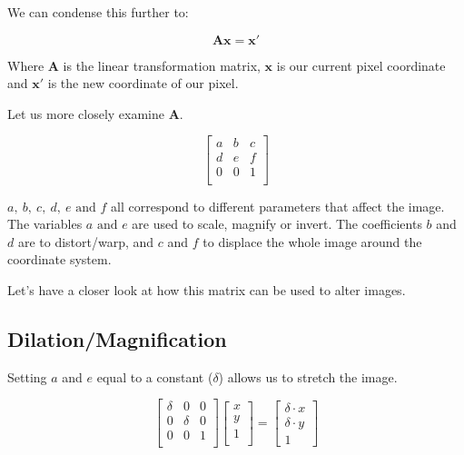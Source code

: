 \documentclass{article}
\begin{document}
We can condense this further to: 

\[%
    \mathbf{A} \mathbf{x} = \mathbf{x}'
\]%

Where $ \mathbf{A} $ is the linear transformation matrix, $ \mathbf{x} $ is our
current pixel coordinate and $ \mathbf{x}' $ is the new coordinate of our pixel.



Let us more closely examine $ \mathbf{A} $.

\[%
    \begin{bmatrix}
        a & b & c \\
		d & e & f \\
		0 & 0 & 1 \\	
    \end{bmatrix}
\]%

$ a,\ b, \ c, \ d, \ e \text{ and }f$ all correspond to different parameters that
affect the image.  The variables $ a \text{ and } e $ are used to scale, magnify 
or invert. The coefficients $ b $ and  $ d $ are to distort/warp, and $ c $ and 
$ f $ to displace the whole image around the coordinate system.

Let's have a closer look at how this matrix can be used to alter images.

\subsection{Dilation/Magnification} 

Setting $ a $ and $ e $ equal to a constant ($ \delta $) allows us to stretch the image.

\[%
    \begin{bmatrix} 
        \delta & 0 & 0 \\
		0 & \delta & 0 \\
		0 & 0 & 1 \\		
    \end{bmatrix}
    \begin{bmatrix}
        x \\
        y \\
		1 \\		
    \end{bmatrix}
    =
    \begin{bmatrix} \delta \cdot x \\ \delta \cdot y \\ 1 \end{bmatrix}
\]%

\begin{figure}[!htbp]
    \centering
\end{figure}
\end{document}
